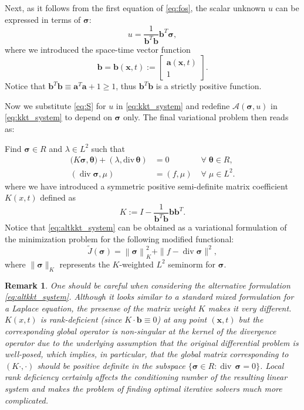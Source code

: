\documentclass[a4paper,12pt]{amsart}
\numberwithin{equation}{section}
\newtheorem{remark}{Remark}[section]
\renewcommand{\div}{\operatorname{div}}
\def\bu{{\mathbf a}} %
\def\bb{{\mathbf b}}
\newcommand{\A}{{\mathcal A}}
\def\XVec#1{{\mathbf #1}}
\def\Xx{\XVec{x}}
\def\btheta{{\boldsymbol \theta}}
\def\bsigma{{\boldsymbol \sigma}}
\begin{document}
Next, as it follows from the first equation of \eqref{eq:fos},  the scalar unknown $u$ can be expressed in terms of $\bsigma$:
\begin{equation}
u = \frac1{\bb^T \bb }\bb^T \bsigma,
\label{eq:S}
\end{equation}
where we introduced the space-time vector function
\[
\bb = \bb(\Xx,t) := \begin{bmatrix} \bu(\Xx,t) \\ 1 \end{bmatrix}.
\]
Notice that $\bb^T\bb \equiv \bu^T\bu+1 \ge 1$, thus $\bb^T\bb$ is a strictly positive function.

Now we substitute \eqref{eq:S} for $u$ in \eqref{eq:kkt_system} and redefine $\A(\bsigma,u)$ in \eqref{eq:kkt_system} to depend on $\bsigma$ only. The final variational problem then reads as:

Find $\bsigma \in R$ and $\lambda \in L^2$ such that 
\begin{equation}
\begin{array}{lll}
\big( K \bsigma, \btheta \big) + (\lambda, \mathrm{div}\,  \btheta) & = 0  & \;\forall\; \btheta \in R,     \\
( \div  \bsigma,\mu )  &= (f, \mu) &  \;\forall\;  \mu\in L^2.
\end{array}
\label{eq:altkkt_system}
\end{equation}
where we have introduced a symmetric positive semi-definite matrix coefficient $K(x,t)$ defined as 
\begin{equation}
K :=  I - \frac{1}{\bb^T\bb} \bb \bb^T.
\end{equation}
Notice that \eqref{eq:altkkt_system} can be obtained as a variational formulation of the minimization problem for the following modified functional:
$$
\tilde{J}(\bsigma) = \left\| \bsigma \right\|_K^2 + \| f- \div \bsigma \| ^2, \label{modfunctional}
$$
where $\|\bsigma\|_K$ represents the $K$-weighted $L^2$ seminorm for $\bsigma$. 

\begin{remark}
One should be careful when considering the alternative formulation \eqref{eq:altkkt_system}. Although it looks similar to a standard mixed formulation for a Laplace equation, the presense of the matrix weight $K$ makes it very different. $K(x,t)$ is rank-deficient (since $K \cdot \bb \equiv 0$) at any point $(\Xx,t)$ but the corresponding global operator is non-singular at the kernel of the divergence operator due to the underlying assumption that the original differential problem is well-posed, which implies, in particular, that the global matrix corresponding to $(K\cdot,\cdot)$ should  be positive definite in the subspace $\{\bsigma \in R : \div \, \bsigma = 0\}$. Local rank deficiency certainly affects the conditioning number of the resulting linear system and makes the problem of finding optimal iterative solvers much more complicated.
\end{remark}
\end{document}
